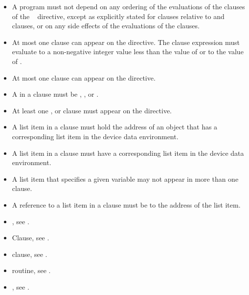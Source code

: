\restrictions
\begin{itemize}
\item A program must not depend on any ordering of the evaluations of the
      clauses of the ~ directive, except as explicitly
      stated for  clauses relative to  and
       clauses, or on any side effects of the evaluations 
      of the clauses.
\item At most one  clause can appear on the directive. The
       clause expression  must evaluate to a non-negative integer
      value less than the value of  or to the value of
      .
\item At most one  clause can appear on the directive.
\item A  in a  clause must be , , 
       or .
\item At least one ,  or 
      clause must appear on the directive.
\item A list item in a  clause must hold the address of
      an object that has a corresponding list item in the device data environment.
\item A list item in a  clause must have a
      corresponding list item in the device data environment.
\item A list item that specifies a given variable may not appear in more than
      one  clause.
\item A reference to a list item in a  clause must be to
      the address of the list item.
\end{itemize}


\crossreferences
\begin{itemize}
\item {}, see
.

\item {} Clause, see .

\item {} clause, see
.

\item {} routine, see .

\item {}, see
.

\end{itemize}



